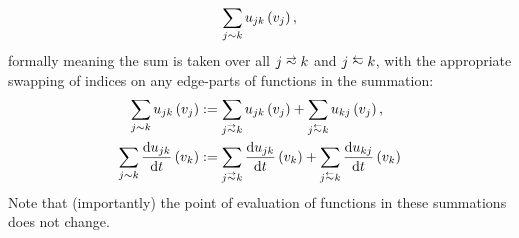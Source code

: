 \begin{align*}
	\sum_{j\sim k} u_{jk}\left( v_j \right),
\end{align*} 
formally meaning the sum is taken over all $j\conLeft k$ and $j\conRight k$, with the appropriate swapping of indices on any edge-parts of functions in the summation:
\begin{align*}
	\sum_{j\con k} u_{jk}\bracs{v_j} &:= \sum_{j\conLeft k}u_{jk}\bracs{v_j} + \sum_{j\conRight k}u_{kj}\bracs{v_j}, \\
	\sum_{j\con k} \diff{u_{jk}}{t}\bracs{v_k} &:= \sum_{j\conLeft k} \diff{u_{jk}}{t}\bracs{v_k} + \sum_{j\conRight k} \diff{u_{kj}}{t}\bracs{v_k}
\end{align*}
Note that (importantly) the point of evaluation of functions in these summations does not change. \newline

